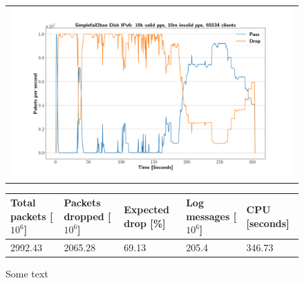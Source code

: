 \begin{figure}[p]
	\label{fig:simplefail2ban:disk:ip6:10m}
	\centering
	\scriptsize
	\begin{tabular}{c}
    	\centerline{\includegraphics[width=1.2\textwidth]{images/simplefail2ban_disk_ipv6_v10k_iv10m_c65534.png}}
	\end{tabular}
	\begin{tabular}{lllll}
		\toprule
		\textbf{Total packets [$10^6$]} & \textbf{Packets dropped [$10^6$]} & \textbf{Expected drop [\%]} & \textbf{Log messages [$10^6$]} & \textbf{CPU [seconds]} \\ \midrule 
		2992.43 & 2065.28 & 69.13 & 205.4 & 346.73 \\
		\bottomrule
	\end{tabular}
	\caption[Simplefail2ban Logfile IPv6 10m PPS]{Some text}
\end{figure}

